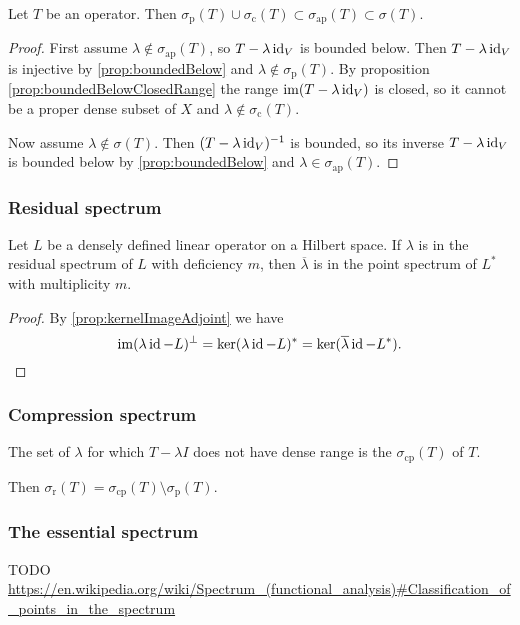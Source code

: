 \begin{lemma}
Let $T$ be an operator. Then $\sigma_\text{p}(T)\cup\sigma_\text{c}(T)\subset\sigma_\text{ap}(T) \subset \sigma(T)$.
\end{lemma}
\begin{proof}
First assume $\lambda\notin \sigma_\text{ap}(T)$, 
so $T-\lambda \operatorname{id}_V$ is bounded below. Then $T-\lambda \operatorname{id}_V$ is injective by \ref{prop:boundedBelow} and $\lambda\notin\sigma_\text{p}(T)$. By proposition \ref{prop:boundedBelowClosedRange} the range $\operatorname{im}(T-\lambda \operatorname{id}_V)$ is closed, so it cannot be a proper dense subset of $X$ and $\lambda\notin\sigma_\text{c}(T)$.

Now assume $\lambda \notin \sigma(T)$. Then $(T-\lambda \operatorname{id}_V)^{-1}$ is bounded, so its inverse $T-\lambda \operatorname{id}_V$ is bounded below by \ref{prop:boundedBelow} and $\lambda\in \sigma_\text{ap}(T)$.
\end{proof}

\subsubsection{Residual spectrum}
\begin{proposition}
Let $L$ be a densely defined linear operator on a Hilbert space. If $\lambda$ is in the residual spectrum of $L$ with deficiency $m$, then $\overline{\lambda}$ is in the point spectrum of $L^*$ with multiplicity $m$.
\end{proposition}
\begin{proof}
By \ref{prop:kernelImageAdjoint} we have
\[ \operatorname{im}(\lambda \operatorname{id} - L)^\perp = \ker(\lambda\operatorname{id} - L)^* = \ker(\overline{\lambda}\operatorname{id} - L^*). \]
\end{proof}

\subsubsection{Compression spectrum}
\begin{definition}
The set of $\lambda$ for which $T-\lambda I$ does not have dense range is the  $\sigma_\text{cp}(T)$ of $T$.
\end{definition}
Then $\sigma_\text{r}(T) = \sigma_\text{cp}(T)\setminus\sigma_\text{p}(T)$.

\subsubsection{The essential spectrum}
TODO \url{https://en.wikipedia.org/wiki/Spectrum_(functional_analysis)#Classification_of_points_in_the_spectrum}


